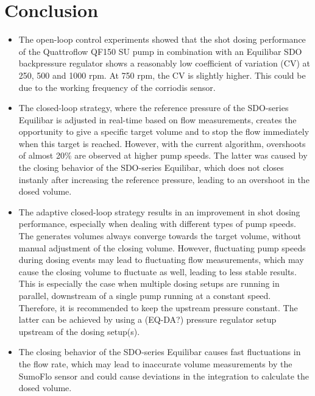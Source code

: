 \documentclass[12pt,a4paper]{article}
\begin{document}
\section{Conclusion}
\label{sec:conclusion}
\begin{itemize}
    \item The open-loop control experiments showed that the shot dosing performance of the Quattroflow QF150 SU pump in combination with an Equilibar SDO backpressure regulator shows a reasonably low coefficient of variation (CV) at 250, 500 and 1000 rpm. At 750 rpm, the CV is slightly higher. This could be due to the working frequency of the corriodis sensor.
    \item The closed-loop strategy, where the reference pressure of the SDO-series Equilibar is adjusted in real-time based on flow measurements, creates the opportunity to give a specific target volume and to stop the flow immediately when this target is reached. However, with the current algorithm, overshoots of almost 20\% are observed at higher pump speeds. The latter was caused by the closing behavior of the SDO-series Equilibar, which does not closes instanly after increasing the reference pressure, leading to an overshoot in the dosed volume.
    \item The adaptive closed-loop strategy results in an improvement in shot dosing performance, especially when dealing with different types of pump speeds. The generates volumes always converge towards the target volume, without manual adjustment of the closing volume. However, fluctuating pump speeds during dosing events may lead to fluctuating flow measurements, which may cause the closing volume to fluctuate as well, leading to less stable results. This is especially the case when multiple dosing setups are running in parallel, downstream of a single pump running at a constant speed. Therefore, it is recommended to keep the upstream pressure constant. The latter can be achieved by using a (EQ-DA?) pressure regulator setup upstream of the dosing setup(s).
    \item The closing behavior of the SDO-series Equilibar causes fast fluctuations in the flow rate, which may lead to inaccurate volume measurements by the SumoFlo sensor and could cause deviations in the integration to calculate the dosed volume. 
\end{itemize}

\clearpage
\end{document}
